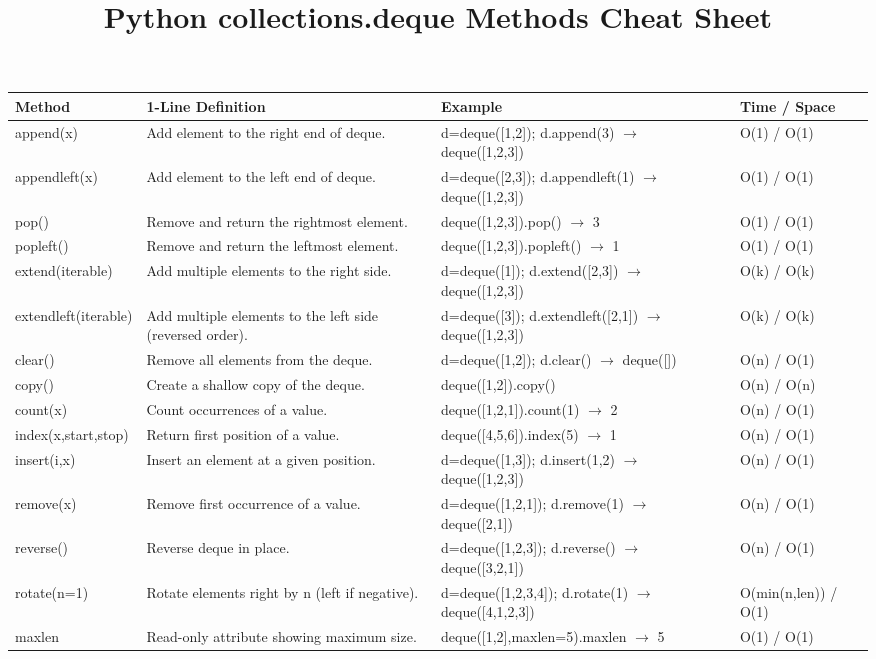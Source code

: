 \documentclass[11pt]{article}
\begin{document}
\title{Python collections.deque Methods Cheat Sheet}
\date{}
\maketitle

\small

\begin{longtable}{|p{2.7cm}|p{4.6cm}|p{4.8cm}|p{2.6cm}|}
\hline
\textbf{Method} & \textbf{1-Line Definition} & \textbf{Example} & \textbf{Time / Space} \\
\hline
append(x) & Add element to the right end of deque. & d=deque([1,2]); d.append(3) $\rightarrow$ deque([1,2,3]) & O(1) / O(1) \\
\hline
appendleft(x) & Add element to the left end of deque. & d=deque([2,3]); d.appendleft(1) $\rightarrow$ deque([1,2,3]) & O(1) / O(1) \\
\hline
pop() & Remove and return the rightmost element. & deque([1,2,3]).pop() $\rightarrow$ 3 & O(1) / O(1) \\
\hline
popleft() & Remove and return the leftmost element. & deque([1,2,3]).popleft() $\rightarrow$ 1 & O(1) / O(1) \\
\hline
extend(iterable) & Add multiple elements to the right side. & d=deque([1]); d.extend([2,3]) $\rightarrow$ deque([1,2,3]) & O(k) / O(k) \\
\hline
extendleft(iterable) & Add multiple elements to the left side (reversed order). & d=deque([3]); d.extendleft([2,1]) $\rightarrow$ deque([1,2,3]) & O(k) / O(k) \\
\hline
clear() & Remove all elements from the deque. & d=deque([1,2]); d.clear() $\rightarrow$ deque([]) & O(n) / O(1) \\
\hline
copy() & Create a shallow copy of the deque. & deque([1,2]).copy() & O(n) / O(n) \\
\hline
count(x) & Count occurrences of a value. & deque([1,2,1]).count(1) $\rightarrow$ 2 & O(n) / O(1) \\
\hline
index(x,start,stop) & Return first position of a value. & deque([4,5,6]).index(5) $\rightarrow$ 1 & O(n) / O(1) \\
\hline
insert(i,x) & Insert an element at a given position. & d=deque([1,3]); d.insert(1,2) $\rightarrow$ deque([1,2,3]) & O(n) / O(1) \\
\hline
remove(x) & Remove first occurrence of a value. & d=deque([1,2,1]); d.remove(1) $\rightarrow$ deque([2,1]) & O(n) / O(1) \\
\hline
reverse() & Reverse deque in place. & d=deque([1,2,3]); d.reverse() $\rightarrow$ deque([3,2,1]) & O(n) / O(1) \\
\hline
rotate(n=1) & Rotate elements right by n (left if negative). & d=deque([1,2,3,4]); d.rotate(1) $\rightarrow$ deque([4,1,2,3]) & O(min(n,len)) / O(1) \\
\hline
maxlen & Read-only attribute showing maximum size. & deque([1,2],maxlen=5).maxlen $\rightarrow$ 5 & O(1) / O(1) \\
\hline
\end{longtable}
\end{document}
